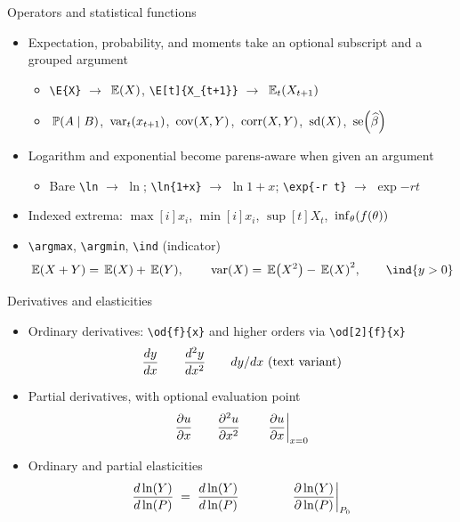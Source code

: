 \documentclass[10pt,itemsep]{beamer}
\begin{document}
\begin{frame}[t]
    {Operators and statistical functions}
    \begin{itemize}
        \item Expectation, probability, and moments take an optional subscript and a grouped argument
        \begin{itemize}
            \item \texttt{\textbackslash E\{X\}} $\to$ $\E{X}$, \texttt{\textbackslash E[t]\{X\_\{t+1\}\}} $\to$ $\E[t]{X_{t+1}}$
            \item $\P{A \mid B}$, $\var[t]{x_{t+1}}$, $\cov{X,Y}$, $\corr{X,Y}$, $\sd{X}$, $\se{\wh{\b}}$
        \end{itemize}
        \item Logarithm and exponential become parens-aware when given an argument
        \begin{itemize}
            \item Bare \texttt{\textbackslash ln} $\to$ $\ln$; \texttt{\textbackslash ln\{1+x\}} $\to$ $\ln{1+x}$; \texttt{\textbackslash exp\{-r t\}} $\to$ $\exp{-r t}$
        \end{itemize}
        \item Indexed extrema: $\max[i]{x_i}$, $\min[i]{x_i}$, $\sup[t]{X_t}$, $\inf[\t]{f(\t)}$
        \item \texttt{\textbackslash argmax}, \texttt{\textbackslash argmin}, \texttt{\textbackslash ind} (indicator)
        \begin{equation*}
            \E{X+Y} = \E{X} + \E{Y}, \qquad \var{X} = \E{X^{2}} - \E{X}^{2}, \qquad \ind{y > 0}
        \end{equation*}
    \end{itemize}
\end{frame}

\begin{frame}[t]
    {Derivatives and elasticities}
    \begin{itemize}
        \item Ordinary derivatives: \texttt{\textbackslash od\{f\}\{x\}} and higher orders via \texttt{\textbackslash od[2]\{f\}\{x\}}
        \begin{equation*}
            \od{y}{x} \qquad \od[2]{y}{x} \qquad \odx{y}{x}\ \text{(text variant)}
        \end{equation*}
        \item Partial derivatives, with optional evaluation point
        \begin{equation*}
            \pd{u}{x} \qquad \pd[2]{u}{x} \qquad \pd{u}{x}{x = 0}
        \end{equation*}
        \item Ordinary and partial elasticities
        \begin{equation*}
            \oe{Y}{P} \;=\; \od{\ln{Y}}{\ln{P}} \qquad\qquad \pe{Y}{P}{P_{0}}
        \end{equation*}
    \end{itemize}
\end{frame}
\end{document}
